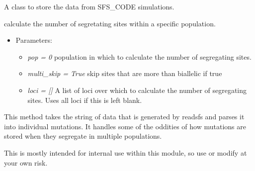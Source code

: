 \documentclass[letterpaper,10pt,english]{sphinxmanual}
\begin{document}
\label{index:module-sfs}

\begin{fulllineitems}
\label{index:sfs.Simulation}
A class to store the data from SFS\_CODE simulations.

\begin{fulllineitems}
\label{index:sfs.Simulation.calc_S}
calculate the number of segretating sites within a specific
population.
\begin{itemize}
\item {} 
Parameters:
\begin{itemize}
\item {} 
\emph{pop = 0}
population in which to calculate the number of segregating sites.

\item {} 
\emph{multi\_skip = True}
skip sites that are more than biallelic if true

\item {} 
\emph{loci = {[}{]}}
A list of loci over which to calculate the number of segregating
sites.  Uses all loci if this is left blank.

\end{itemize}

\end{itemize}

\end{fulllineitems}


\begin{fulllineitems}
\label{index:sfs.Simulation.make_muts}
This method takes the string of data that is generated by readsfs and 
parses it into individual mutations.  It handles some of the oddities
of how mutations are stored when they segregate in multiple 
populations.

This is mostly intended for internal use within this module, so use 
or modify at your own risk.

\end{fulllineitems}


\end{fulllineitems}

\label{index:module-sfsplot}\label{index:module-ms}\label{index:module-readsfs}
\end{document}

